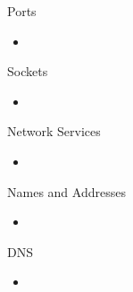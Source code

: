 \documentclass{beamer}
\begin{document}
\begin{frame}{Ports}

\begin{itemize}
\item
\end{itemize}

\end{frame}

\begin{frame}{Sockets}

\begin{itemize}
\item
\end{itemize}

\end{frame}

\begin{frame}{Network Services}

\begin{itemize}
\item
\end{itemize}

\end{frame}


\begin{frame}{Names and Addresses}

\begin{itemize}
\item
\end{itemize}

\end{frame}

\begin{frame}{DNS}

\begin{itemize}
\item
\end{itemize}

\end{frame}
\end{document}
